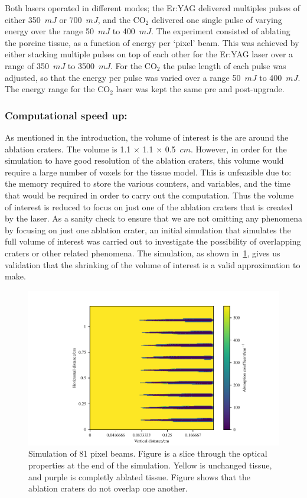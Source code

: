 Both lasers operated in different modes; the Er:YAG delivered multiples pulses of either 350~$mJ$ or 700~$mJ$, and the CO$_2$ delivered one single pulse of varying energy over the range 50~$mJ$ to 400~$mJ$. The experiment consisted of ablating the porcine tissue, as a function of energy per `pixel' beam. This was achieved by either stacking multiple pulses on top of each other for the Er:YAG laser over a range of 350~$mJ$ to 3500~$mJ$. For the CO$_2$ the pulse length of each pulse was adjusted, so that the energy per pulse was varied over a range 50~$mJ$ to 400~$mJ$. The energy range for the CO$_2$ laser was kept the same pre and post-upgrade.

\subsubsection{Computational speed up:}
As mentioned in the introduction, the volume of interest is the are around the ablation craters. The volume is 1.1 $\times$ 1.1 $\times$ 0.5~$cm$. However, in order for the simulation to have good resolution of the ablation craters, this volume would require a large number of voxels for the tissue model. This is unfeasible due to: the memory required to store the various counters, and variables, and the time that would be required in order to carry out the computation. Thus the volume of interest is reduced to focus on just one of the ablation craters that is created by the laser.
As a sanity check to ensure that we are not omitting any phenomena by focusing on just one ablation crater, an initial simulation that simulates the full volume of interest was carried out to investigate the possibility of overlapping craters or other related phenomena. The simulation, as shown in~\cref{fig:sizecheck}, gives us validation that the shrinking of the volume of interest is a valid approximation to make.

\begin{figure}
	\centering
    \includegraphics[width=\columnwidth]{./ablation/images/slice.pdf}
    \caption{Simulation of 81 pixel beams. Figure is a slice through the optical properties at the end of the simulation. Yellow is unchanged tissue, and purple is completly ablated tissue. Figure shows that the ablation craters do not overlap one another.}\label{fig:sizecheck}
\end{figure}

